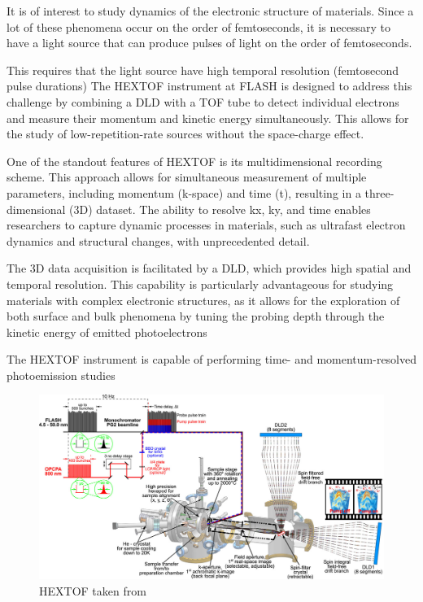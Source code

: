 It is of interest to study dynamics of the electronic structure of materials. Since a lot of these phenomena occur on the order of femtoseconds, it is necessary to have a light source that can produce pulses of light on the order of femtoseconds.

This requires that the light source have high temporal resolution (femtosecond pulse durations) 
 The \gls{HEXTOF} instrument at \gls{FLASH} is designed to address this challenge by combining a \gls{DLD} with a \gls{TOF} tube to detect individual electrons and measure their momentum and kinetic energy simultaneously. This allows for the study of low-repetition-rate sources without the space-charge effect.



One of the standout features of HEXTOF is its multidimensional recording scheme. This approach allows for simultaneous measurement of multiple parameters, including momentum (k-space) and time (t), resulting in a three-dimensional (3D) dataset. The ability to resolve kx, ky, and time enables researchers to capture dynamic processes in materials, such as ultrafast electron dynamics and structural changes, with unprecedented detail.

The 3D data acquisition is facilitated by a \gls{DLD}, which provides high spatial and temporal resolution. This capability is particularly advantageous for studying materials with complex electronic structures, as it allows for the exploration of both surface and bulk phenomena by tuning the probing depth through the kinetic energy of emitted photoelectrons 


The \gls{HEXTOF} instrument is capable of performing time- and momentum-resolved photoemission studies 
\begin{figure}
    \centering
    \includegraphics[width=1\linewidth]{images/2024-08-27-10-50-01.png}
    \caption{HEXTOF taken from \cite{kutnyakhovTimeMomentumresolvedPhotoemission2020}}
    \label{fig:hex-tof}
\end{figure}


